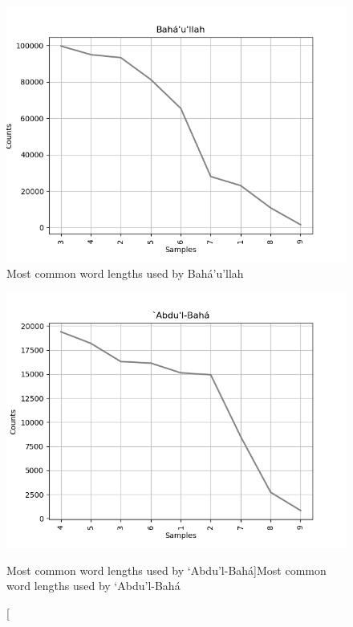 \documentclass[12pt, oneside]{report}
\begin{document}
\begin{figure}[htb]
	\centering
	\includegraphics[width=15cm]{figures/word-length-bahaullah.png}
	\caption[Most common word lengths used by Bah\'{a}'u'llah]{Most common word lengths used by Bah\'{a}'u'llah}
	\label{fig:word-length-bahaullah}
\end{figure} 
\begin{figure}[htb]
	\centering
	\includegraphics[width=15cm]{figures/word-length-abdulbaha.png}
	\caption[Most common word lengths used by `Abdu'l-Bah\'{a}]{Most common word lengths used by `Abdu'l-Bah\'{a}}
	\label{fig:word-length-abdulbaha}
\end{figure} 
\end{document}
